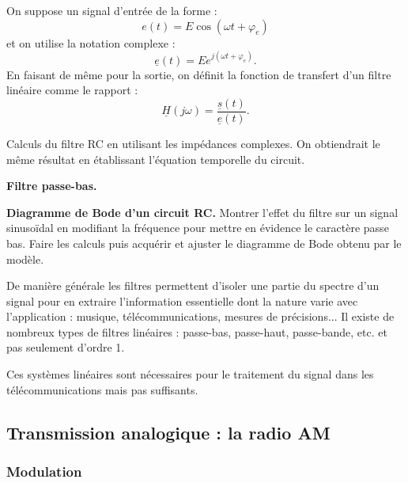 On suppose un signal d'entrée de la forme :
\begin{equation}
e(t) = E\cos(\omega t+\varphi_e)
\end{equation}
et on utilise la notation complexe :
\begin{equation}
\underline{e}(t) = E e^{j(\omega t + \varphi_e)}.
\end{equation}
En faisant de même pour la sortie, on définit la fonction de transfert d'un filtre linéaire comme le rapport :
\begin{equation}
\underline{H}(j\omega) = \frac{\underline{s}(t)}{\underline{e}(t)}.
\end{equation}

Calculs du filtre RC en utilisant les impédances complexes.
On obtiendrait le même résultat en établissant l'équation temporelle du circuit.

\begin{slide}
\textbf{Filtre passe-bas.}
\end{slide}

\begin{experience}
\textbf{Diagramme de Bode d'un circuit RC.}
Montrer l'effet du filtre sur un signal sinusoïdal en modifiant la fréquence pour mettre en évidence le caractère passe bas.
Faire les calculs puis acquérir et ajuster le diagramme de Bode obtenu par le modèle.
\end{experience}

De manière générale les filtres permettent d'isoler une partie du spectre d'un signal pour en extraire l'information essentielle dont la nature varie avec l'application : musique, télécommunications, mesures de précisions...
Il existe de nombreux types de filtres linéaires : passe-bas, passe-haut, passe-bande, etc. et pas seulement d'ordre 1.

\begin{transition}
Ces systèmes linéaires sont nécessaires pour le traitement du signal dans les télécommunications mais pas suffisants.
\end{transition}

\subsection{Transmission analogique : la radio AM}

\subsubsection{Modulation}

